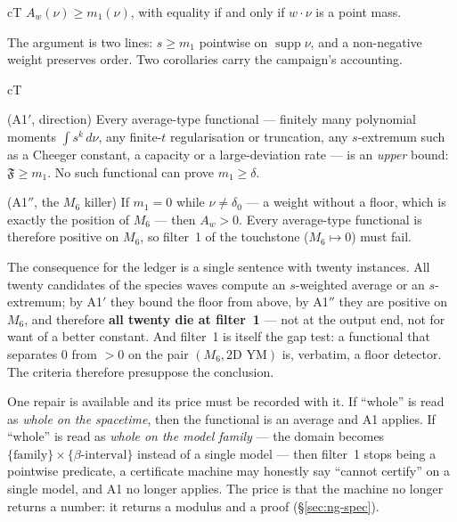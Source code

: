 \begin{claimbox}{cT}
\label{lem:ng-a1}
$A_w(\nu)\ge m_1(\nu)$, with equality if and only if $w\cdot\nu$ is a point mass.
\end{claimbox}

The argument is two lines: $s\ge m_1$ pointwise on $\operatorname{supp}\nu$, and a non-negative weight
preserves order. Two corollaries carry the campaign's accounting.

\begin{claimbox}{cT}

(A1$'$, direction) Every average-type functional --- finitely many polynomial moments
$\int s^k\,d\nu$, any finite-$t$ regularisation or truncation, any $s$-extremum such as a
Cheeger constant, a capacity or a large-deviation rate --- is an \emph{upper} bound:
$\mathfrak F\ge m_1$. No such functional can prove $m_1\ge\delta$.

(A1$''$, the $M_6$ killer) If $m_1=0$ while $\nu\neq\delta_0$ --- a weight without a floor, which is
exactly the position of $M_6$ --- then $A_w>0$. Every average-type functional is therefore positive
on $M_6$, so filter~1 of the touchstone ($M_6\mapsto0$) must fail.
\end{claimbox}

The consequence for the ledger is a single sentence with twenty instances. All twenty candidates of
the species waves compute an $s$-weighted average or an $s$-extremum; by A1$'$ they bound the floor
from above, by A1$''$ they are positive on $M_6$, and therefore \textbf{all twenty die at filter~1}
--- not at the output end, not for want of a better constant. And filter~1 is itself the gap test: a
functional that separates $0$ from $>0$ on the pair
$(M_6,\text{2D YM})$ is, verbatim, a floor detector. The criteria therefore presuppose the
conclusion.

One repair is available and its price must be recorded with it. If ``whole'' is read as
\emph{whole on the spacetime}, then the functional is an average and A1 applies. If ``whole'' is read
as \emph{whole on the model family} --- the domain becomes $\{\text{family}\}\times\{\beta\text{-interval}\}$
instead of a single model --- then filter~1 stops being a pointwise predicate, a
certificate machine may honestly say ``cannot certify'' on a single model, and A1 no longer applies.
The price is that the machine no longer returns a number: it returns a modulus and a proof
(\S\ref{sec:ng-spec}).


